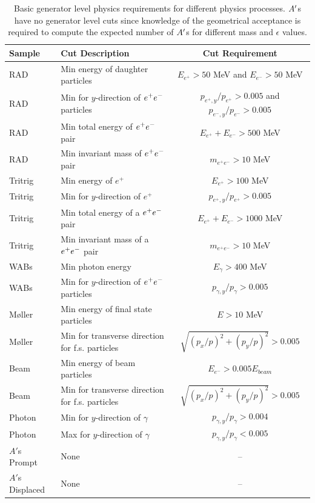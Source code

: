 \begin{table}[!hb] 
\centering
\begin{tabular}{llc}
   \toprule    
    Sample & Cut Description & Cut Requirement  \\
    \midrule
     RAD & Min energy of daughter particles & $E_{e^+}>50$ MeV and $E_{e^-}>50$ MeV \\
     RAD & Min for $y$-direction of $e^{+}e^{-}$ particles & $p_{e^+,y}/p_{e^+}>0.005$ and $p_{e^-,y}/p_{e^-}>0.005$ \\
     RAD & Min total energy of $e^{+}e^{-}$ pair & $E_{e^+}+E_{e^-}>500$ MeV \\
     RAD & Min invariant mass of $e^{+}e^{-}$ pair& $m_{e^+e^-}>10$ MeV \\
     \midrule
     \midrule
     Tritrig & Min energy of $e^+$ & $E_{e^+}>100$ MeV \\
     Tritrig & Min for $y$-direction of $e^+$& $p_{e^+,y}/p_{e^+}>0.005$ \\
     Tritrig & Min total energy of a $e^{+}e^{-}$ pair & $E_{e^+}+E_{e^-}>1000$ MeV \\
     Tritrig & Min invariant mass of a $e^{+}e^{-}$ pair & $m_{e^+e^-}>10$ MeV \\
     \midrule
     \midrule
     WABs & Min photon energy & $E_{\gamma}>400$ MeV \\
     WABs & Min for $y$-direction of $e^{+}e^{-}$ particles & $p_{\gamma,y}/p_{\gamma}>0.005$ \\
     \midrule
     \midrule
     M\o ller & Min energy of final state particles & $E>10$ MeV \\
     M\o ller & Min for transverse direction for f.s. particles & $\sqrt{(p_x/p)^2+(p_y/p)^2}>0.005$ \\
     \midrule
     \midrule
     Beam & Min energy of beam particles & $E_{e^-}>0.005E_{beam}$ \\
     Beam & Min for transverse direction for f.s. particles & $\sqrt{(p_x/p)^2+(p_y/p)^2}>0.005$ \\
     \midrule
     \midrule
     Photon & Min for $y$-direction of $\gamma$ & $p_{\gamma,y}/p_{\gamma}>0.004$\\
     Photon & Max for $y$-direction of $\gamma$ & $p_{\gamma,y}/p_{\gamma}<0.005$\\
     \midrule
     \midrule
     $A'$s Prompt & None & -- \\
     $A'$s Displaced & None & -- \\
     \bottomrule
\end{tabular}
\caption{Basic generator level physics requirements for different physics processes. $A^\prime$s have no generator level cuts since knowledge of the geometrical acceptance is required to compute the expected number of $A^\prime$s for different mass and $\epsilon$ values.}
\label{table:MCrequirements}
\end{table}

